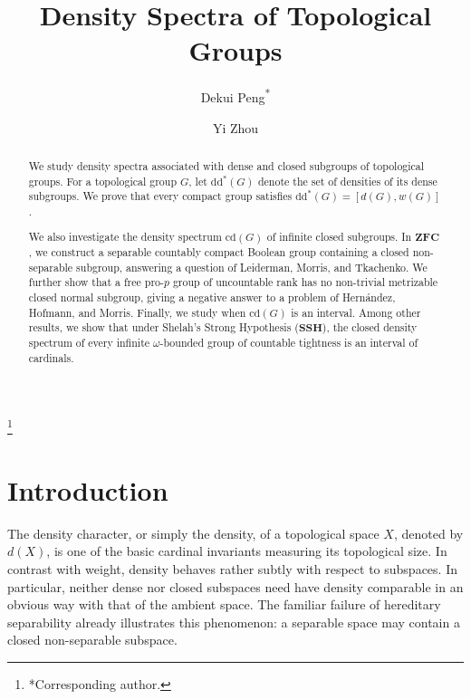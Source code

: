 \documentclass[12pt]{amsart}
\theoremstyle{definition}
\numberwithin{equation}{section}
\theoremstyle{remark}
\def\cd{\mathrm{cd}}
\def\dd{\mathrm{dd}}
\begin{document}
	
	
	\title[Density Spectra]{Density Spectra of Topological Groups}
	
\author[D. Peng]{Dekui Peng\textsuperscript{*}}
 \address[D. Peng]
{Institute of Mathematics, Nanjing Normal University, Nanjing 210024, China}
\thanks{*Corresponding author.}

\author[Y. Zhou]{Yi Zhou}
 \address[Y. Zhou]
{School of Sciences, Southwest Petroleum University,
Chengdu 610500, China}




	
\begin{abstract}
We study density spectra associated with dense and closed subgroups of
topological groups. For a topological group $G$, let $\dd^*(G)$ denote the
set of densities of its dense subgroups. We prove that every compact group
satisfies
$\dd^*(G)=[d(G),w(G)]$. 

We also investigate the density spectrum $\cd(G)$ of infinite closed
subgroups. In $\mathbf{ZFC}$, we construct a separable countably compact
Boolean group containing a closed non-separable subgroup, answering a
question of Leiderman, Morris, and Tkachenko. We further show that a free
pro-$p$ group of uncountable rank has no non-trivial metrizable closed
normal subgroup, giving a negative answer to a problem of Hern\'andez,
Hofmann, and Morris. Finally, we study when $\cd(G)$ is an interval. Among other
results, we show that
under Shelah's Strong Hypothesis ($\mathbf{SSH}$), the closed density spectrum of every
infinite $\omega$-bounded group of countable tightness is an interval of cardinals.
\end{abstract}
\maketitle
\setcounter{tocdepth}{1}
\section{Introduction}\label{s1}

The density character, or simply the density, of a topological space $X$,
denoted by $d(X)$, is one of the basic cardinal invariants measuring its
topological size. In contrast with weight, density behaves rather subtly
with respect to subspaces. In particular, neither dense nor closed
subspaces need have density comparable in an obvious way with that of the
ambient space. The familiar failure of hereditary separability already
illustrates this phenomenon: a separable space may contain a closed
non-separable subspace.
\end{document}
